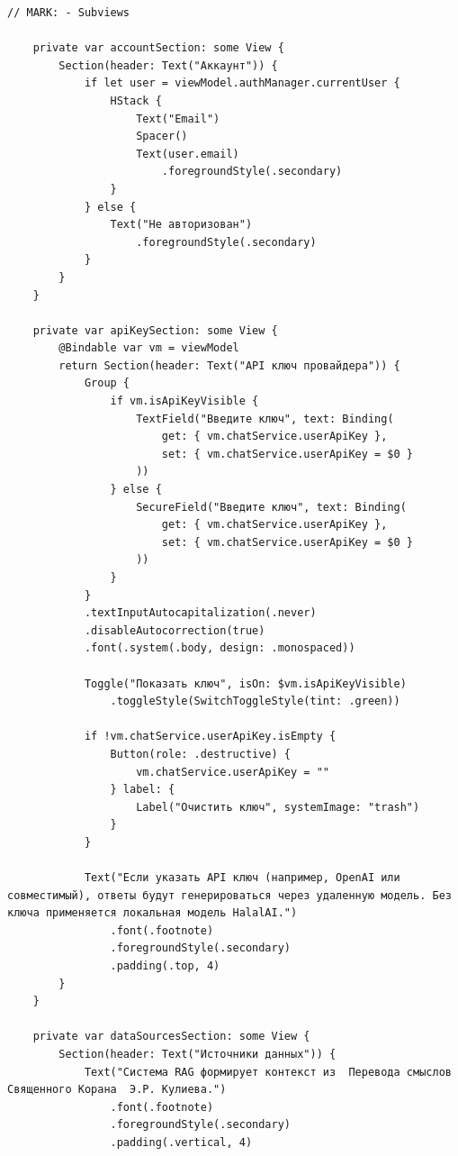 \begin{lstlisting}[basicstyle=\tiny\ttfamily,breaklines=true]
    // MARK: - Subviews
    
    private var accountSection: some View {
        Section(header: Text("Аккаунт")) {
            if let user = viewModel.authManager.currentUser {
                HStack {
                    Text("Email")
                    Spacer()
                    Text(user.email)
                        .foregroundStyle(.secondary)
                }
            } else {
                Text("Не авторизован")
                    .foregroundStyle(.secondary)
            }
        }
    }
    
    private var apiKeySection: some View {
        @Bindable var vm = viewModel
        return Section(header: Text("API ключ провайдера")) {
            Group {
                if vm.isApiKeyVisible {
                    TextField("Введите ключ", text: Binding(
                        get: { vm.chatService.userApiKey },
                        set: { vm.chatService.userApiKey = $0 }
                    ))
                } else {
                    SecureField("Введите ключ", text: Binding(
                        get: { vm.chatService.userApiKey },
                        set: { vm.chatService.userApiKey = $0 }
                    ))
                }
            }
            .textInputAutocapitalization(.never)
            .disableAutocorrection(true)
            .font(.system(.body, design: .monospaced))

            Toggle("Показать ключ", isOn: $vm.isApiKeyVisible)
                .toggleStyle(SwitchToggleStyle(tint: .green))

            if !vm.chatService.userApiKey.isEmpty {
                Button(role: .destructive) {
                    vm.chatService.userApiKey = ""
                } label: {
                    Label("Очистить ключ", systemImage: "trash")
                }
            }

            Text("Если указать API ключ (например, OpenAI или совместимый), ответы будут генерироваться через удаленную модель. Без ключа применяется локальная модель HalalAI.")
                .font(.footnote)
                .foregroundStyle(.secondary)
                .padding(.top, 4)
        }
    }
    
    private var dataSourcesSection: some View {
        Section(header: Text("Источники данных")) {
            Text("Система RAG формирует контекст из  Перевода смыслов Священного Корана  Э.Р. Кулиева.")
                .font(.footnote)
                .foregroundStyle(.secondary)
                .padding(.vertical, 4)
            

\end{lstlisting}
